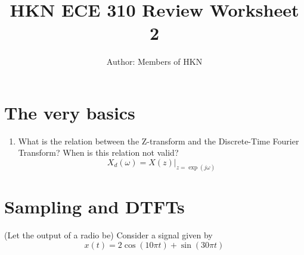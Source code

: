 \documentclass{article}
\title{HKN ECE 310 Review Worksheet 2}
\author{Author: Members of HKN }
\date{}
\begin{document}
\maketitle

\section{The very basics}
\begin{enumerate}
    \item What is the relation between the Z-transform and the Discrete-Time Fourier Transform? When is this relation not valid?
    $$ X_{d}(\omega) = X(z)\vert_{z=\exp(j\omega)} $$

\end{enumerate}

\section{Sampling and DTFTs}
(Let the output of a radio be) Consider a signal given by
$$
x(t) = 2\cos(10\pi t) + \sin(30\pi t)
$$
\end{document}
